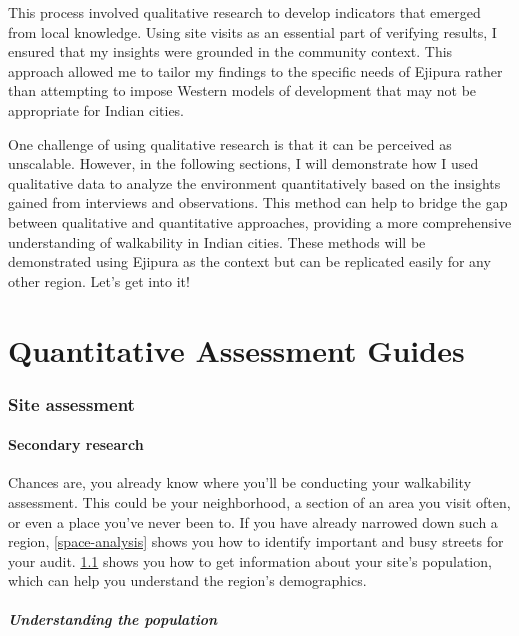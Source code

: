 \documentclass[
]{latex/krantz}
\begin{document}
This process involved qualitative research to develop indicators that emerged from local knowledge. Using site visits as an essential part of verifying results, I ensured that my insights were grounded in the community context. This approach allowed me to tailor my findings to the specific needs of Ejipura rather than attempting to impose Western models of development that may not be appropriate for Indian cities.

One challenge of using qualitative research is that it can be perceived as unscalable. However, in the following sections, I will demonstrate how I used qualitative data to analyze the environment quantitatively based on the insights gained from interviews and observations. This method can help to bridge the gap between qualitative and quantitative approaches, providing a more comprehensive understanding of walkability in Indian cities. These methods will be demonstrated using Ejipura as the context but can be replicated easily for any other region. Let's get into it!

\hypertarget{part-quantitative-assessment-guides}{%
\part{Quantitative Assessment Guides}\label{part-quantitative-assessment-guides}}

\hypertarget{site-assessment}{%
\section{Site assessment}\label{site-assessment}}

\hypertarget{secondary-research}{%
\subsection{Secondary research}\label{secondary-research}}

Chances are, you already know where you'll be conducting your walkability assessment. This could be your neighborhood, a section of an area you visit often, or even a place you've never been to. If you have already narrowed down such a region, \ref{space-analysis} shows you how to identify important and busy streets for your audit. \ref{secondary-research} shows you how to get information about your site's population, which can help you understand the region's demographics.

\hypertarget{understanding-the-population}{%
\subsubsection{Understanding the population}\label{understanding-the-population}}
\end{document}
